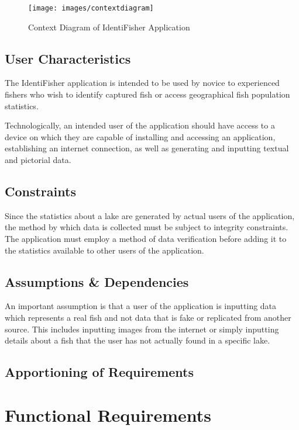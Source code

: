 \documentclass{article}
\begin{document}
\begin{figure}[H]
	\texttt{[image: images/contextdiagram]}
	\caption{Context Diagram of IdentiFisher Application}
\end{figure}


\subsection{User Characteristics}
The IdentiFisher application is intended to be used by novice to experienced fishers who wish to identify captured fish or access geographical fish population statistics. 

Technologically, an intended user of the application should have access to a device on which they are capable of installing and accessing an application, establishing an internet connection, as well as generating and inputting textual and pictorial data. 

\subsection{Constraints}

Since the statistics about a lake are generated by actual users of the application, the method by which data is collected must be subject to integrity constraints. The application must employ a method of data verification before adding it to the statistics available to other users of the application. 

\subsection{Assumptions \& Dependencies}

An important assumption is that a user of the application is inputting data which represents a real fish and not data that is fake or replicated from another source. This includes inputting images from the internet or simply inputting details about a fish that the user has not actually found in a specific lake. 

\subsection{Apportioning of Requirements}

\section{Functional Requirements}
\end{document}
